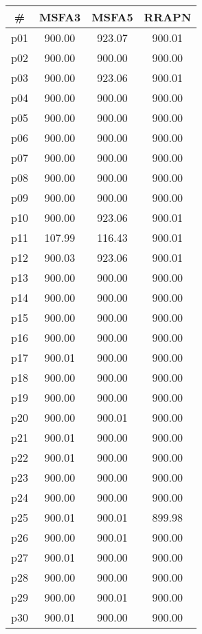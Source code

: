\begin{tabular}{c||c|c|c}
\textbf{\#} & \textbf{MSFA3} & \textbf{MSFA5} & \textbf{RRAPN}\\
\hline
\hline
p01 & 900.00 & 923.07 & 900.01\\
p02 & 900.00 & 900.00 & 900.00\\
p03 & 900.00 & 923.06 & 900.01\\
p04 & 900.00 & 900.00 & 900.00\\
p05 & 900.00 & 900.00 & 900.00\\
p06 & 900.00 & 900.00 & 900.00\\
p07 & 900.00 & 900.00 & 900.00\\
p08 & 900.00 & 900.00 & 900.00\\
p09 & 900.00 & 900.00 & 900.00\\
p10 & 900.00 & 923.06 & 900.01\\
p11 & 107.99 & 116.43 & 900.01\\
p12 & 900.03 & 923.06 & 900.01\\
p13 & 900.00 & 900.00 & 900.00\\
p14 & 900.00 & 900.00 & 900.00\\
p15 & 900.00 & 900.00 & 900.00\\
p16 & 900.00 & 900.00 & 900.00\\
p17 & 900.01 & 900.00 & 900.00\\
p18 & 900.00 & 900.00 & 900.00\\
p19 & 900.00 & 900.00 & 900.00\\
p20 & 900.00 & 900.01 & 900.00\\
p21 & 900.01 & 900.00 & 900.00\\
p22 & 900.01 & 900.00 & 900.00\\
p23 & 900.00 & 900.00 & 900.00\\
p24 & 900.00 & 900.00 & 900.00\\
p25 & 900.01 & 900.01 & 899.98\\
p26 & 900.00 & 900.01 & 900.00\\
p27 & 900.01 & 900.00 & 900.00\\
p28 & 900.00 & 900.00 & 900.00\\
p29 & 900.00 & 900.01 & 900.00\\
p30 & 900.01 & 900.00 & 900.00\\
\end{tabular}

